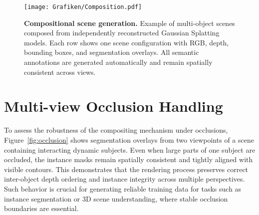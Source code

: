 \begin{figure}[t]
    \centering
    \texttt{[image: Grafiken/Composition.pdf]}
    \caption{
        \textbf{Compositional scene generation.}
        Example of multi-object scenes composed from independently reconstructed Gaussian Splatting models. 
        Each row shows one scene configuration with RGB, depth, bounding boxes, and segmentation overlays.
        All semantic annotations are generated automatically and remain spatially consistent across views.
    }
    \label{fig:composition}
\end{figure}

\section{Multi-view Occlusion Handling}
To assess the robustness of the compositing mechanism under occlusions, 
Figure~\ref{fig:occlusion} shows segmentation overlays from two viewpoints of a scene containing interacting dynamic subjects. 
Even when large parts of one subject are occluded, the instance masks remain spatially consistent and tightly aligned with visible contours. 
This demonstrates that the rendering process preserves correct inter-object depth ordering and instance integrity across multiple perspectives. 
Such behavior is crucial for generating reliable training data for tasks such as instance segmentation or 3D scene understanding, where stable occlusion boundaries are essential.

